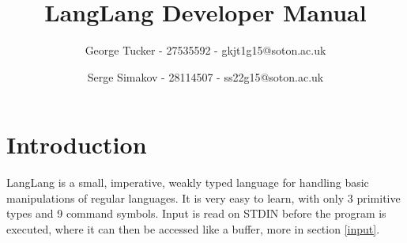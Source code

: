\documentclass{article}
\title{LangLang Developer Manual}
\author{George Tucker - 27535592 - gkjt1g15@soton.ac.uk \and Serge Simakov - 28114507 - ss22g15@soton.ac.uk}
\begin{document}
\maketitle

\section{Introduction}
\begin{normalsize}
LangLang is a small, imperative, weakly typed language for handling basic manipulations of regular languages. It is very easy to learn, with only 3 primitive types and 9 command symbols. Input is read on STDIN before the program is executed, where it can then be accessed like a buffer, more in section \ref{input}.
\end{normalsize}





\end{document}
